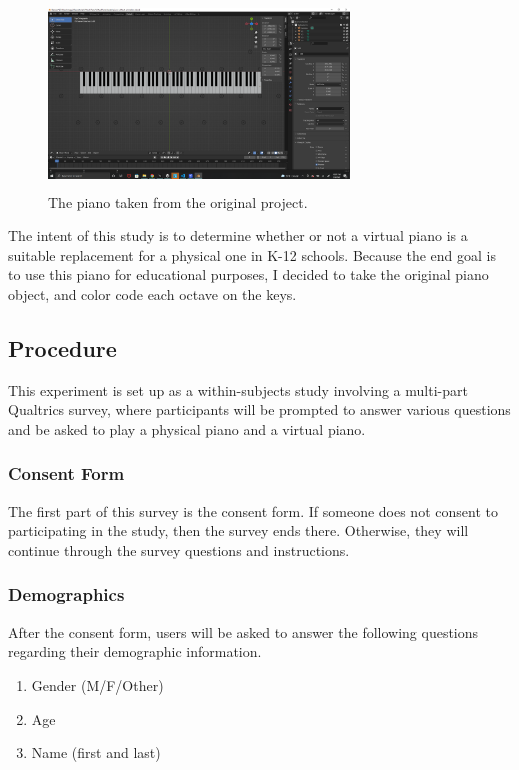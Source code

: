 \documentclass[sigconf,authordraft]{acmart}
\begin{document}
\begin{figure}[h]
\centering
\includegraphics[width=8cm, height=5cm]{OriginalPiano.png}
\centering
\caption{The piano taken from the original project.}
\end{figure}

The intent of this study is to determine whether or not a virtual piano is a suitable replacement for a physical one in K-12 schools.  Because the end goal is to use this piano for educational purposes, I decided to take the original piano object, and color code each octave on the keys.  

\subsection{Procedure}
This experiment is set up as a within-subjects study involving a multi-part Qualtrics survey, where participants will be prompted to answer various questions and be asked to play a physical piano and a virtual piano.  

\subsubsection{Consent Form}
The first part of this survey is the consent form.  If someone does not consent to participating in the study, then the survey ends there.  Otherwise, they will continue through the survey questions and instructions.
\subsubsection{Demographics}
After the consent form, users will be asked to answer the following questions regarding their demographic information.  
\begin{enumerate}
 \item Gender (M/F/Other)
 \item Age
 \item Name (first and last)
 \end{enumerate}
\end{document}
